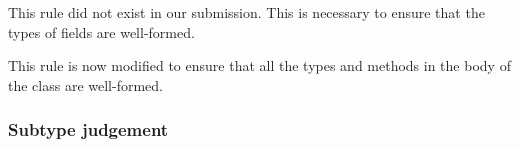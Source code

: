 

This rule did not exist in our submission. This is necessary to ensure
that the types of fields are well-formed.



This rule is now modified to ensure that all the types and methods in
the body of the class are well-formed.



\subsubsection{
        Subtype judgement
}


